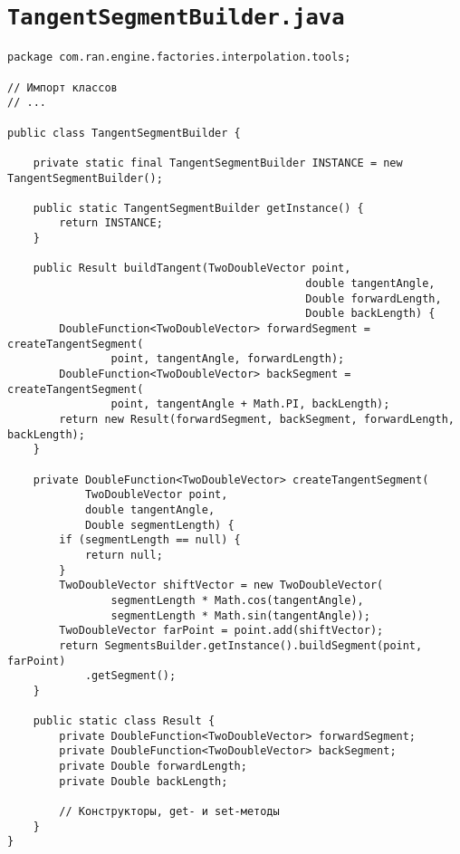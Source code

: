 \section*{\texttt{TangentSegmentBuilder.java}}
\begin{verbatim}
package com.ran.engine.factories.interpolation.tools;

// Импорт классов
// ...

public class TangentSegmentBuilder {

    private static final TangentSegmentBuilder INSTANCE = new TangentSegmentBuilder();

    public static TangentSegmentBuilder getInstance() {
        return INSTANCE;
    }

    public Result buildTangent(TwoDoubleVector point,
                                              double tangentAngle,
                                              Double forwardLength,
                                              Double backLength) {
        DoubleFunction<TwoDoubleVector> forwardSegment = createTangentSegment(
                point, tangentAngle, forwardLength);
        DoubleFunction<TwoDoubleVector> backSegment = createTangentSegment(
                point, tangentAngle + Math.PI, backLength);
        return new Result(forwardSegment, backSegment, forwardLength, backLength);
    }

    private DoubleFunction<TwoDoubleVector> createTangentSegment(
            TwoDoubleVector point,
            double tangentAngle,
            Double segmentLength) {
        if (segmentLength == null) {
            return null;
        }
        TwoDoubleVector shiftVector = new TwoDoubleVector(
                segmentLength * Math.cos(tangentAngle),
                segmentLength * Math.sin(tangentAngle));
        TwoDoubleVector farPoint = point.add(shiftVector);
        return SegmentsBuilder.getInstance().buildSegment(point, farPoint)
            .getSegment();
    }

    public static class Result {
        private DoubleFunction<TwoDoubleVector> forwardSegment;
        private DoubleFunction<TwoDoubleVector> backSegment;
        private Double forwardLength;
        private Double backLength;

        // Конструкторы, get- и set-методы
    }
}
\end{verbatim}

